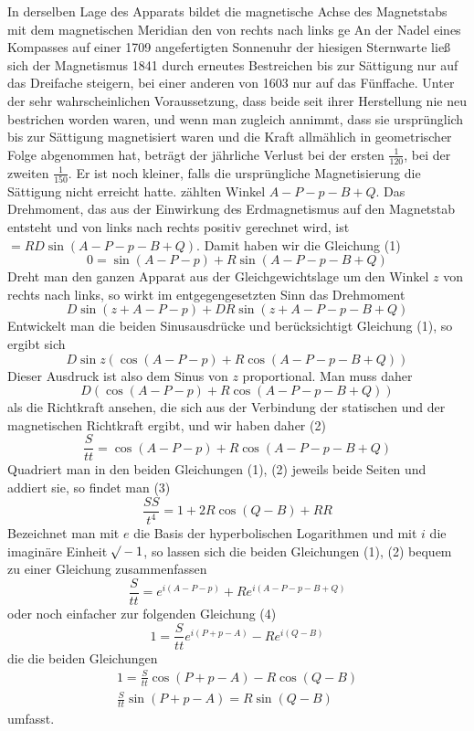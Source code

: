 In derselben Lage des Apparats bildet die magnetische Achse des Magnetstabs mit dem magnetischen Meridian den von rechts nach links ge%
\expandafter\def\csname HistoricalNoteText416\endcsname{An der Nadel eines Kompasses auf einer 1709 angefertigten Sonnenuhr der hiesigen Sternwarte ließ sich der Magnetismus 1841 durch erneutes Bestreichen bis zur Sättigung nur auf das Dreifache steigern, bei einer anderen von 1603 nur auf das Fünffache. Unter der sehr wahrscheinlichen Voraussetzung, dass beide seit ihrer Herstellung nie neu bestrichen worden waren, und wenn man zugleich annimmt, dass sie ursprünglich bis zur Sättigung magnetisiert waren und die Kraft allmählich in geometrischer Folge abgenommen hat, beträgt der jährliche Verlust bei der ersten $\frac{1}{120}$, bei der zweiten $\frac{1}{150}$. Er ist noch kleiner, falls die ursprüngliche Magnetisierung die Sättigung nicht erreicht hatte.}%
zählten Winkel $A-P-p-B+Q$. Das Drehmoment, das aus der Einwirkung des Erdmagnetismus auf den Magnetstab entsteht und von links nach rechts positiv gerechnet wird, ist $=RD\sin(A-P-p-B+Q)$. Damit haben wir die Gleichung (1)
\[
0=\sin(A-P-p)+R\sin(A-P-p-B+Q)
\]
Dreht man den ganzen Apparat aus der Gleichgewichtslage um den Winkel $z$ von rechts nach links, so wirkt im entgegengesetzten Sinn das Drehmoment
\[
D\sin(z+A-P-p)+DR\sin(z+A-P-p-B+Q)
\]
Entwickelt man die beiden Sinusausdrücke und berücksichtigt Gleichung (1), so ergibt sich
\[
D\sin z(\cos(A-P-p)+R\cos(A-P-p-B+Q))
\]
Dieser Ausdruck ist also dem Sinus von $z$ proportional. Man muss daher
\[
D(\cos(A-P-p)+R\cos(A-P-p-B+Q))
\]
als die Richtkraft ansehen, die sich aus der Verbindung der statischen und der magnetischen Richtkraft ergibt, und wir haben daher (2)
\[
\frac{S}{tt}=\cos(A-P-p)+R\cos(A-P-p-B+Q)
\]
Quadriert man in den beiden Gleichungen (1), (2) jeweils beide Seiten und addiert sie, so findet man (3)
\[
\frac{SS}{t^4}=1+2R\cos(Q-B)+RR
\]
Bezeichnet man mit $e$ die Basis der hyperbolischen Logarithmen und mit $i$ die imaginäre Einheit $\mathord{{}^{}\!\surd}-1$, so lassen sich die beiden Gleichungen (1), (2) bequem zu einer Gleichung zusammenfassen
\[
\frac{S}{tt}=e^{i(A-P-p)}+Re^{i(A-P-p-B+Q)}
\]
oder noch einfacher zur folgenden Gleichung (4)
\[
1=\frac{S}{tt}e^{i(P+p-A)}-Re^{i(Q-B)}
\]
die die beiden Gleichungen
\[
\begin{gathered}
1=\frac{S}{tt}\cos(P+p-A)-R\cos(Q-B)\\
\frac{S}{tt}\sin(P+p-A)=R\sin(Q-B)
\end{gathered}
\]
umfasst.

